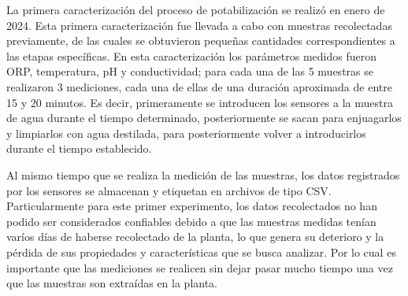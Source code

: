 La primera caracterización del proceso de potabilización se realizó en enero de 2024. Esta primera caracterización fue llevada a cabo con muestras recolectadas previamente, de las cuales 
se obtuvieron pequeñas cantidades correspondientes a las etapas específicas. En esta caracterización los parámetros medidos fueron ORP, temperatura, pH y conductividad; para cada una de las 5 muestras 
se realizaron 3 mediciones, cada una de ellas de una duración aproximada de entre 15 y 20 minutos. Es decir, primeramente se introducen los sensores a la muestra de agua durante el tiempo determinado, posteriormente se 
sacan para enjuagarlos y limpiarlos con agua destilada, para posteriormente volver a introducirlos durante el tiempo establecido. 

Al mismo tiempo que se realiza la medición de las muestras, los datos registrados por los sensores se almacenan y etiquetan en archivos de tipo CSV. Particularmente para este primer experimento, los datos recolectados no han 
podido ser considerados confiables debido a que las muestras medidas tenían varíos días de haberse recolectado de la planta, lo que genera su deterioro y la pérdida de sus propiedades y características que se 
busca analizar. Por lo cual es importante que las mediciones se realicen sin dejar pasar mucho tiempo una vez que las muestras son extraídas en la planta.








